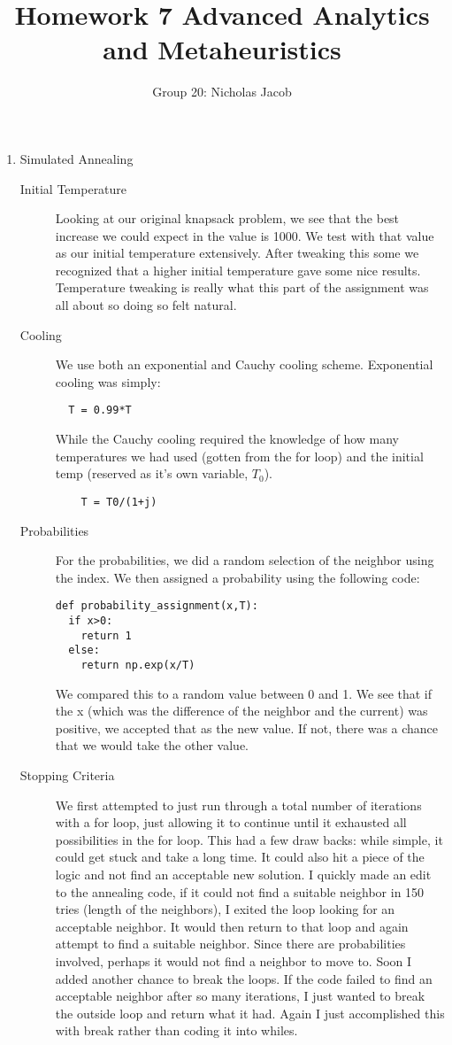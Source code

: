 \documentclass[11pt]{article}
\author{Group 20: Nicholas Jacob}
\title{Homework 7 Advanced Analytics and Metaheuristics}
\begin{document}
\maketitle

\begin{enumerate}
\item Simulated Annealing

\begin{description}
\item[Initial Temperature]  Looking at our original knapsack problem, we see that the best increase we could expect in the value is 1000.  We test with that value as our initial temperature extensively.  After tweaking this some we recognized that a higher initial temperature gave some nice results.  Temperature tweaking is really what this part of the assignment was all about so doing so felt natural.
\item[Cooling]  We use both an exponential and Cauchy cooling scheme. Exponential cooling was simply:
\begin{verbatim}
  T = 0.99*T
\end{verbatim}
While the Cauchy cooling required the knowledge of how many temperatures we had used (gotten from the for loop) and the initial temp (reserved as it's own variable, $T_0$).
\begin{verbatim}
	T = T0/(1+j)
\end{verbatim}
\item[Probabilities] For the probabilities, we did a random selection of the neighbor using the index.  We then assigned a probability using the following code:
\begin{verbatim}
def probability_assignment(x,T):
  if x>0:
    return 1
  else:
    return np.exp(x/T)
\end{verbatim}
We compared this to a random value between 0 and 1.  We see that if the x (which was the difference of the neighbor and the current) was positive, we accepted that as the new value.  If not, there was a chance that we would take the other value.
\item[Stopping Criteria]  We first attempted to just run through a total number of iterations with a for loop, just allowing it to continue until it exhausted all possibilities in the for loop.  This had a few draw backs:  while simple, it could get stuck and take a long time.  It could also hit a piece of the logic and not find an acceptable new solution.  I quickly made an edit to the annealing code, if it could not find a suitable neighbor in 150 tries (length of the neighbors), I exited the loop looking for an acceptable neighbor.  It would then return to that loop and again attempt to find a suitable neighbor.  Since there are probabilities involved, perhaps it would not find a neighbor to move to. Soon I added another chance to break the loops.  If the code failed to find an acceptable neighbor after so many iterations, I just wanted to break the outside loop and return what it had.  Again I just accomplished this with break rather than coding it into whiles.



\end{description}
\end{enumerate}
\end{document}

